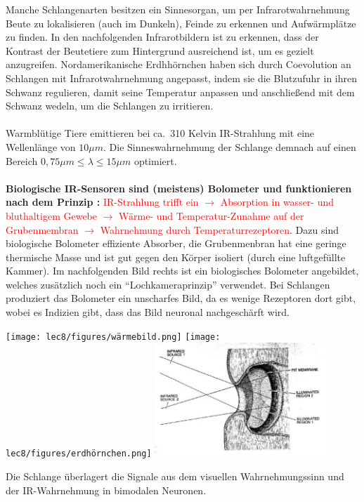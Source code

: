 Manche Schlangenarten besitzen ein Sinnesorgan, um per Infrarotwahrnehmung Beute zu lokalisieren (auch im Dunkeln), Feinde zu erkennen und Aufwärmplätze zu finden. In den nachfolgenden Infrarotbildern ist zu erkennen, dass der Kontrast der Beutetiere zum Hintergrund ausreichend ist, um es gezielt anzugreifen. Nordamerikanische Erdhhörnchen haben sich durch Coevolution an Schlangen mit Infrarotwahrnehmung angepasst, indem sie die Blutzufuhr in ihren Schwanz regulieren,  damit seine Temperatur anpassen und anschließend mit dem Schwanz wedeln, um die Schlangen zu irritieren.
\\\\
Warmblütige Tiere emittieren bei ca.\ 310 Kelvin IR-Strahlung mit eine Wellenlänge von $10\mu m$. Die Sinneswahrnehmung der Schlange demnach auf einen Bereich $0,75 \mu m \leq \lambda \leq 15 \mu m$ optimiert.
\\\\
\textbf{Biologische IR-Sensoren sind (meistens) Bolometer und funktionieren nach dem Prinzip \dangersign:} \textcolor{red}{IR-Strahlung trifft ein $\rightarrow$ Absorption in wasser- und bluthaltigem Gewebe $\rightarrow$ Wärme- und Temperatur-Zunahme auf der Grubenmembran $\rightarrow$ Wahrnehmung durch Temperaturrezeptoren}. Dazu sind biologische Bolometer effiziente Absorber, die Grubenmenbran hat eine geringe thermische Masse und ist gut gegen den Körper isoliert (durch eine luftgefüllte Kammer). Im nachfolgenden Bild rechts ist ein biologisches Bolometer angebildet, welches zusätzlich noch ein ``Lochkameraprinzip'' verwendet. Bei Schlangen produziert das Bolometer ein unscharfes Bild, da es wenige Rezeptoren dort gibt, wobei es Indizien gibt, dass das Bild neuronal nachgeschärft wird.

\begin{center}
    \texttt{[image: lec8/figures/wärmebild.png]}
    \hfill
    \texttt{[image: lec8/figures/erdhörnchen.png]}
    \hfill
    \includegraphics[width=6.5cm]{lec8/figures/bolometer.png}
\end{center}

Die Schlange überlagert die Signale aus dem visuellen Wahrnehmungssinn und der IR-Wahrnehmung in bimodalen Neuronen.


